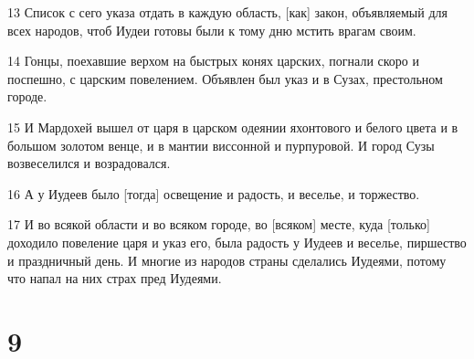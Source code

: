 \par 13 Список с сего указа отдать в каждую область, [как] закон, объявляемый для всех народов, чтоб Иудеи готовы были к тому дню мстить врагам своим.
\par 14 Гонцы, поехавшие верхом на быстрых конях царских, погнали скоро и поспешно, с царским повелением. Объявлен был указ и в Сузах, престольном городе.
\par 15 И Мардохей вышел от царя в царском одеянии яхонтового и белого цвета и в большом золотом венце, и в мантии виссонной и пурпуровой. И город Сузы возвеселился и возрадовался.
\par 16 А у Иудеев было [тогда] освещение и радость, и веселье, и торжество.
\par 17 И во всякой области и во всяком городе, во [всяком] месте, куда [только] доходило повеление царя и указ его, была радость у Иудеев и веселье, пиршество и праздничный день. И многие из народов страны сделались Иудеями, потому что напал на них страх пред Иудеями.

\chapter{9}

